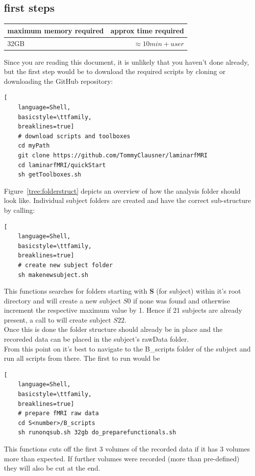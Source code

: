 \documentclass[12pt,a4paper]{scrartcl}
\begin{document}
\subsection{first steps}
\begin{table}[h]
\begin{tabular}{l | r}
\toprule
maximum memory required & approx time required\\\toprule
32GB & $\approx 10min+user$ \\\bottomrule
\end{tabular}
\end{table}
\FloatBarrier
\noindent Since you are reading this document, it is unlikely that you haven't done already, but the first step would be to download the required scripts by cloning or downloading the GitHub repository:
\begin{lstlisting}[
    language=Shell,
    basicstyle=\ttfamily,
    breaklines=true]
    # download scripts and toolboxes
    cd myPath
    git clone https://github.com/TommyClausner/laminarfMRI
    cd laminarfMRI/quickStart
    sh getToolboxes.sh
\end{lstlisting}
Figure~\ref{tree:folderstruct} depicts an overview of how the analysis folder should look like. Individual subject folders are created and have the correct sub-structure by calling:
\begin{lstlisting}[
    language=Shell,
    basicstyle=\ttfamily,
    breaklines=true]
    # create new subject folder
    sh makenewsubject.sh
 \end{lstlisting}
This functions searches for folders starting with \textbf{S} (for subject) within it's root directory and will create a new subject $S0$ if none was found and otherwise increment the respective maximum value by 1. Hence if 21 subjects are already present, a call to \texttt{} will create subject $S22$.\\
Once this is done the folder structure should already be in place and the recoreded data can be placed in the subject's rawData folder.\\
From this point on it's best to navigate to the B\_scripts folder of the subject and run all scripts from there. The first to run would be
\begin{lstlisting}[
    language=Shell,
    basicstyle=\ttfamily,
    breaklines=true]
    # prepare fMRI raw data
    cd S<number>/B_scripts
    sh runonqsub.sh 32gb do_preparefunctionals.sh
\end{lstlisting}
This functions cuts off the first 3 volumes of the recorded data if it has 3 volumes more than expected. If further volumes were recorded (more than pre-defined) they will also be cut at the end.
\end{document}
